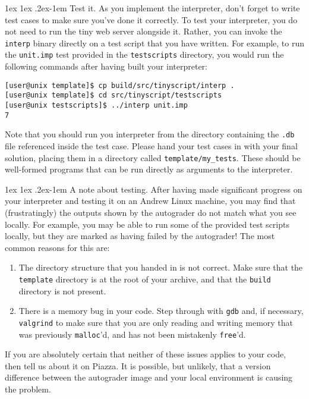 \documentclass[11pt]{article}
\makeatletter
\renewcommand{\paragraph}{%
  \@startsection{paragraph}{4}%
  {\z@}{1ex \@plus 1ex \@minus .2ex}{-1em}%
  {\normalfont\normalsize\bfseries}
}
\makeatother
\begin{document}
\paragraph{Test it.} As you implement the interpreter, don't forget to write test cases to make sure you've done it correctly. 
To test your interpreter, you do not need to run the tiny web server alongside it. Rather, you can invoke the \verb'interp' binary directly on a test script that you have written.
For example, to run the \verb'unit.imp' test provided in the \verb'testscripts' directory, you would run the following commands after having built your interpreter:
\begin{lstlisting}[basicstyle=\footnotesize\ttfamily,backgroundcolor=\color{gray!15}]
[user@unix template]$ cp build/src/tinyscript/interp .
[user@unix template]$ cd src/tinyscript/testscripts
[user@unix testscripts]$ ../interp unit.imp
7
\end{lstlisting}
Note that you should run you interpreter from the directory containing the \verb'.db' file referenced inside the test case.
Please hand your test cases in with your final solution, placing them in a directory called \verb'template/my_tests'. 
These should be well-formed programs that can be run directly as arguments to the interpreter.

\paragraph{A note about testing.} After having made significant progress on your interpreter and testing it on an Andrew Linux machine, you may find that (frustratingly) the outputs shown by the autograder do not match what you see locally. For example, you may be able to run some of the provided test scripts locally, but they are marked as having failed by the autograder! The most common reasons for this are: 
\begin{enumerate}
\item The directory structure that you handed in is not correct. Make sure that the \verb'template' directory is at the root of your archive, and that the \verb'build' directory is not present.
\item There is a memory bug in your code. Step through with \verb'gdb' and, if necessary, \verb'valgrind' to make sure that you are only reading and writing memory that was previously \verb'malloc''d, and has not been mistakenly \verb'free''d.
\end{enumerate}
If you are absolutely certain that neither of these issues applies to your code, then tell us about it on Piazza. It is possible, but unlikely, that a version difference between the autograder image and your local environment is causing the problem.
\end{document}
